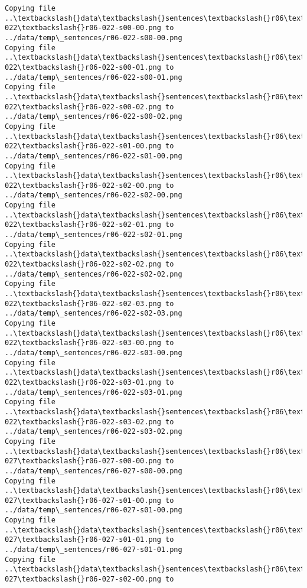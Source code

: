 \documentclass[11pt]{article}
\begin{document}
\begin{Verbatim}[commandchars=\\\{\}]
Copying file ..\textbackslash{}data\textbackslash{}sentences\textbackslash{}r06\textbackslash{}r06-022\textbackslash{}r06-022-s00-00.png to
../data/temp\_sentences/r06-022-s00-00.png
Copying file ..\textbackslash{}data\textbackslash{}sentences\textbackslash{}r06\textbackslash{}r06-022\textbackslash{}r06-022-s00-01.png to
../data/temp\_sentences/r06-022-s00-01.png
Copying file ..\textbackslash{}data\textbackslash{}sentences\textbackslash{}r06\textbackslash{}r06-022\textbackslash{}r06-022-s00-02.png to
../data/temp\_sentences/r06-022-s00-02.png
Copying file ..\textbackslash{}data\textbackslash{}sentences\textbackslash{}r06\textbackslash{}r06-022\textbackslash{}r06-022-s01-00.png to
../data/temp\_sentences/r06-022-s01-00.png
Copying file ..\textbackslash{}data\textbackslash{}sentences\textbackslash{}r06\textbackslash{}r06-022\textbackslash{}r06-022-s02-00.png to
../data/temp\_sentences/r06-022-s02-00.png
Copying file ..\textbackslash{}data\textbackslash{}sentences\textbackslash{}r06\textbackslash{}r06-022\textbackslash{}r06-022-s02-01.png to
../data/temp\_sentences/r06-022-s02-01.png
Copying file ..\textbackslash{}data\textbackslash{}sentences\textbackslash{}r06\textbackslash{}r06-022\textbackslash{}r06-022-s02-02.png to
../data/temp\_sentences/r06-022-s02-02.png
Copying file ..\textbackslash{}data\textbackslash{}sentences\textbackslash{}r06\textbackslash{}r06-022\textbackslash{}r06-022-s02-03.png to
../data/temp\_sentences/r06-022-s02-03.png
Copying file ..\textbackslash{}data\textbackslash{}sentences\textbackslash{}r06\textbackslash{}r06-022\textbackslash{}r06-022-s03-00.png to
../data/temp\_sentences/r06-022-s03-00.png
Copying file ..\textbackslash{}data\textbackslash{}sentences\textbackslash{}r06\textbackslash{}r06-022\textbackslash{}r06-022-s03-01.png to
../data/temp\_sentences/r06-022-s03-01.png
Copying file ..\textbackslash{}data\textbackslash{}sentences\textbackslash{}r06\textbackslash{}r06-022\textbackslash{}r06-022-s03-02.png to
../data/temp\_sentences/r06-022-s03-02.png
Copying file ..\textbackslash{}data\textbackslash{}sentences\textbackslash{}r06\textbackslash{}r06-027\textbackslash{}r06-027-s00-00.png to
../data/temp\_sentences/r06-027-s00-00.png
Copying file ..\textbackslash{}data\textbackslash{}sentences\textbackslash{}r06\textbackslash{}r06-027\textbackslash{}r06-027-s01-00.png to
../data/temp\_sentences/r06-027-s01-00.png
Copying file ..\textbackslash{}data\textbackslash{}sentences\textbackslash{}r06\textbackslash{}r06-027\textbackslash{}r06-027-s01-01.png to
../data/temp\_sentences/r06-027-s01-01.png
Copying file ..\textbackslash{}data\textbackslash{}sentences\textbackslash{}r06\textbackslash{}r06-027\textbackslash{}r06-027-s02-00.png to

\end{Verbatim}
\end{document}

